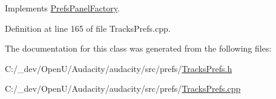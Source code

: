 Implements \hyperlink{class_prefs_panel_factory_a4814184d6050665a43f4929caa73aa0c}{Prefs\+Panel\+Factory}.



Definition at line 165 of file Tracks\+Prefs.\+cpp.



The documentation for this class was generated from the following files\+:\begin{DoxyCompactItemize}
\item 
C\+:/\+\_\+dev/\+Open\+U/\+Audacity/audacity/src/prefs/\hyperlink{_tracks_prefs_8h}{Tracks\+Prefs.\+h}\item 
C\+:/\+\_\+dev/\+Open\+U/\+Audacity/audacity/src/prefs/\hyperlink{_tracks_prefs_8cpp}{Tracks\+Prefs.\+cpp}\end{DoxyCompactItemize}
